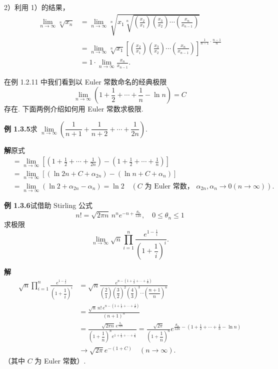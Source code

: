 \documentclass[UTF8,12pt,a4paper,fontset=fandol]{ctexart}
\begin{document}
2）利用 1）的结果，
\[
\begin{aligned}
\lim_{n\to\infty}\sqrt[n]{x_n}
&=\lim_{n\to\infty}\sqrt[n]{x_1\sqrt[n]{\left(\frac{x_2}{x_1}\right)\left(\frac{x_3}{x_2}\right)\cdots\left(\frac{x_n}{x_{n-1}}\right)}}\\
&=\lim_{n\to\infty}\sqrt[n]{x_1}
\left[\left(\frac{x_2}{x_1}\right)\left(\frac{x_3}{x_2}\right)\cdots\left(\frac{x_n}{x_{n-1}}\right)\right]^{\frac1{n-1}\cdot\frac{n-1}{n}}\\
&=1\cdot\lim_{n\to\infty}\frac{x_n}{x_{n-1}}.
\end{aligned}
\]

在例 1.2.11 中我们看到以 Euler 常数命名的经典极限
\[
  \lim_{n\to\infty}\left(1+\frac12+\cdots+\frac1n-\ln n\right)=C
\]
存在. 下面两例介绍如何用 Euler 常数求极限.

\noindent\textbf{例 1.3.5}\quad 求 $\lim\limits_{n\to\infty}\left(\dfrac1{n+1}+\dfrac1{n+2}+\cdots+\dfrac1{2n}\right)$.

\noindent\textbf{解}\quad 原式
\[
\begin{aligned}
&=\lim_{n\to\infty}\left[\left(1+\frac12+\cdots+\frac1{2n}\right)
-\left(1+\frac12+\cdots+\frac1n\right)\right]\\
&=\lim_{n\to\infty}\left[(\ln 2n+C+\alpha_{2n})-(\ln n+C+\alpha_n)\right]\\
&=\lim_{n\to\infty}(\ln2+\alpha_{2n}-\alpha_n)=\ln2
\quad(C\text{ 为 Euler 常数， }\alpha_{2n},\alpha_n\to0(n\to\infty)).
\end{aligned}
\]

\noindent\textbf{例 1.3.6}\quad 试借助 Stirling 公式
\[
  n!=\sqrt{2\pi n}\,n^ne^{-n+\frac{\theta_n}{12n}},\quad 0\le\theta_n\le1
\]
求极限
\[
  \lim_{n\to\infty}\sqrt n\prod_{i=1}^n
  \frac{e^{1-\frac1i}}{\left(1+\dfrac1i\right)^i}.
\]

\noindent\textbf{解}\quad
\[
\begin{aligned}
\sqrt n\prod_{i=1}^n\frac{e^{1-\frac1i}}{\left(1+\dfrac1i\right)^i}
&=\sqrt n\frac{e^{n-(1+\frac12+\cdots+\frac1n)}}
{\left(\dfrac21\right)\left(\dfrac32\right)^2\left(\dfrac43\right)^3\cdots\left(\dfrac{n+1}{n}\right)^n}\\
&=\frac{\sqrt n\,n!\,e^{n-(1+\frac12+\cdots+\frac1n)}}{(n+1)^n}\\
&=\frac{\sqrt{2\pi n}\,e^{\frac{\theta_n}{12n}}}
{\left(1+\dfrac1n\right)^n e^{1+\frac12+\cdots+\frac1n}}
=\frac{\sqrt{2\pi}}{\left(1+\dfrac1n\right)^n}e^{\frac{\theta_n}{12n}-\left(1+\frac12+\cdots+\frac1n-\ln n\right)}\\
&\to \sqrt{2\pi}e^{-(1+C)}\quad(n\to\infty).
\end{aligned}
\]
（其中 $C$ 为 Euler 常数）.
\end{document}
